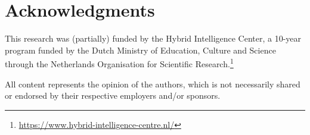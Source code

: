 \documentclass[preprint, 3p, times, twocolumn]{elsarticle}
\begin{document}
\section*{Acknowledgments}
  This research was (partially) funded by the Hybrid Intelligence Center, a 10-year program funded by the Dutch Ministry of Education, Culture and Science through the Netherlands Organisation for Scientific Research.\footnote{\url{https://www.hybrid-intelligence-centre.nl/}}

  All content represents the opinion of the authors, which is not necessarily shared or endorsed by their respective employers and/or sponsors.
  


 


\clearpage

\appendix
\end{document}
